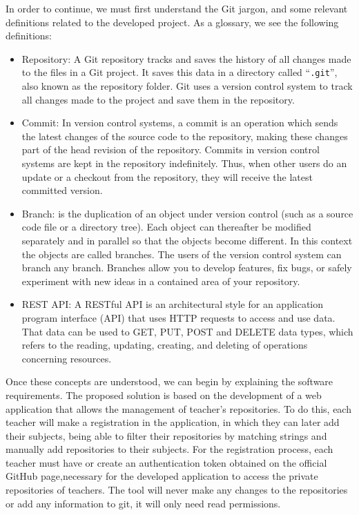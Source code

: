 In order to continue, we must first understand the Git jargon, and some
relevant definitions related to the developed project. As a glossary, we
see the following definitions:

\begin{itemize}
\item Repository: A Git repository tracks and saves the history of all
  changes made to the files in a Git project. It saves this data in a
  directory called ``{\tt .git}'', also known as the repository folder. Git
  uses a version control system to track all changes made to the project
  and save them in the repository.

\item Commit: In version control systems, a commit is an operation which
  sends the latest changes of the source code to the repository, making
  these changes part of the head revision of the repository. Commits in
  version control systems are kept in the repository indefinitely. Thus,
  when other users do an update or a checkout from the repository, they
  will receive the latest committed version.

\item Branch: is the duplication of an object under version control (such
  as a source code file or a directory tree). Each object can thereafter be
  modified separately and in parallel so that the objects become different.
  In this context the objects are called branches. The users of the version
  control system can branch any branch. Branches allow you to develop
  features, fix bugs, or safely experiment with new ideas in a contained
  area of your repository.

\item REST API: A RESTful API is an architectural style for an application
  program interface (API) that uses HTTP requests to access and use data.
  That data can be used to GET, PUT, POST and DELETE data types, which
  refers to the reading, updating, creating, and deleting of operations
  concerning resources.
\end{itemize}

Once these concepts are understood, we can begin by explaining the software
requirements. The proposed solution is based on the development of a web
application that allows the management of teacher’s repositories. To do
this, each teacher will make a registration in the application, in which
they can later add their subjects, being able to filter their repositories
by matching strings and manually add repositories to their subjects. For
the registration process, each teacher must have or create an
authentication token obtained on the official GitHub page,necessary for the
developed application to access the private repositories of teachers. The
tool will never make any changes to the repositories or add any information
to git, it will only need read permissions.

